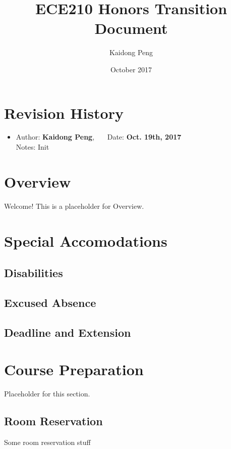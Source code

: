 \documentclass[12pt]{article}
\title{ECE210 Honors Transition Document}
\author{Kaidong Peng}
\date{October 2017}
\makeatletter
\renewcommand\tableofcontents{%
  \null\hfill\textbf{\Large\contentsname}\hfill\null\par
  \@mkboth{\MakeUppercase\contentsname}{\MakeUppercase\contentsname}%
  \@starttoc{toc}%
}
\newcommand{\RevisionHistoryItem}[3]{
    \item {
        Author: \textbf{#1}, \ \ \  Date: \textbf{#2}
    } \\
    Notes: #3
}
\makeatother
\begin{document}
\null  %
\nointerlineskip  %
\vfill
\let\snewpage \newpage
\let\newpage \relax
\maketitle
\let \newpage \snewpage
\vfill
\newpage

\tableofcontents
\newpage

\section*{Revision History}
    \begin{itemize}
        \RevisionHistoryItem{Kaidong Peng}{Oct. 19th, 2017}
        {Init}
    \end{itemize}
\newpage

\section{Overview}
    Welcome! This is a placeholder for Overview.
\newpage

\section{Special Accomodations}
    \subsection{Disabilities}
    \subsection{Excused Absence}
    \subsection{Deadline and Extension}
\newpage

\section{Course Preparation}
    Placeholder for this section.
    \subsection{Room Reservation}
        Some room reservation stuff
\end{document}
